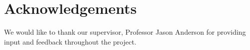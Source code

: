 \section*{Acknowledgements}

We would like to thank our supervisor, Professor Jason Anderson for providing input and feedback throughout the project.

